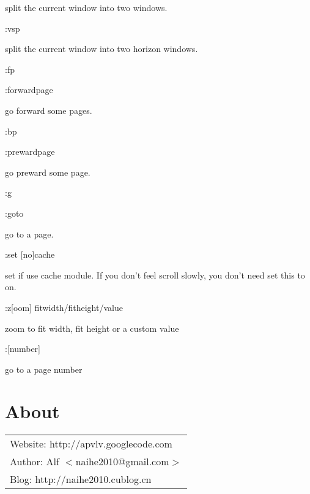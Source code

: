 \documentclass[a4paper,12pt]{article}
\begin{document}
\begin{description}
split the current window into two windows.

\item :vsp

split the current window into two horizon windows.

\item :fp

\item :forwardpage 

go forward some pages.

\item :bp

\item :prewardpage

go preward some page.

\item :g

\item :goto

go to a page.

\item :set [no]cache

set if use cache module. If you don't feel scroll slowly, you don't need set this to on.

\item :z[oom] fitwidth/fitheight/value

zoom to fit width, fit height or a custom value

\item :[number]

go to a page number

\end{description}

\newpage

\section{About}

\large
\begin{tabular}{l}
Website: http://apvlv.googlecode.com \\
Author: Alf $<$naihe2010@gmail.com$>$ \\
Blog: http://naihe2010.cublog.cn
\end{tabular}
\end{document}
